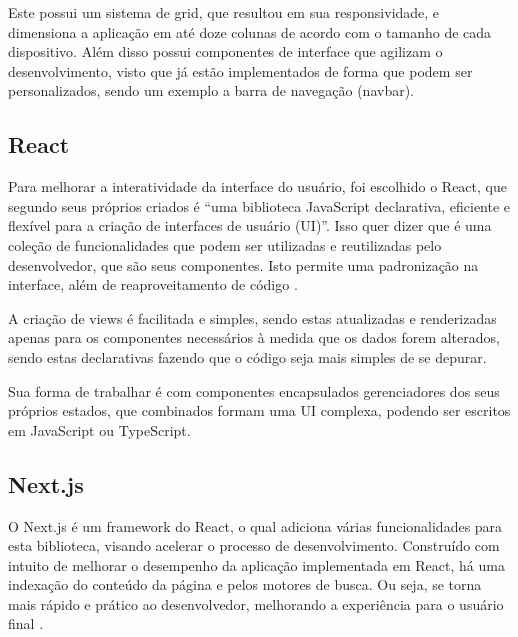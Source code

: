 Este possui um sistema de grid, que resultou em sua responsividade, e dimensiona a aplicação em até doze colunas de acordo com o tamanho de cada dispositivo. Além disso possui componentes de interface que agilizam o desenvolvimento, visto que já estão implementados de forma que podem ser personalizados, sendo um exemplo a barra de navegação (navbar).

\subsection{React}
Para melhorar a interatividade da interface do usuário, foi escolhido o React, que segundo seus próprios criados é “uma biblioteca JavaScript declarativa, eficiente e flexível para a criação de interfaces de usuário (UI)”. Isso quer dizer que é uma coleção de funcionalidades que podem ser utilizadas e reutilizadas pelo desenvolvedor, que são seus componentes. Isto permite uma padronização na interface, além de reaproveitamento de código \cite{ZAMMETTI}.

A criação de views é facilitada e simples, sendo estas atualizadas e renderizadas apenas para os componentes necessários à medida que os dados forem alterados, sendo estas declarativas fazendo que o código seja mais simples de se depurar.

Sua forma de trabalhar é com componentes encapsulados gerenciadores dos seus próprios estados, que combinados formam uma UI complexa, podendo ser escritos em JavaScript ou TypeScript.

\subsection{Next.js}
O Next.js é um framework do React, o qual adiciona várias funcionalidades para esta biblioteca, visando acelerar o processo de desenvolvimento. Construído com intuito de melhorar o desempenho da aplicação implementada em React, há uma indexação do conteúdo da página e pelos motores de busca. Ou seja, se torna mais rápido e prático ao desenvolvedor, melhorando a experiência para o usuário final \cite{KONSHIN}.

